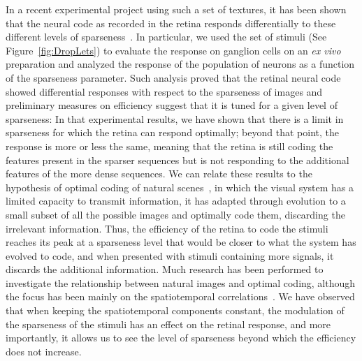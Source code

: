 \documentclass[a4paper, 10pt, twocolumns]{article}
\begin{document}
In a recent experimental project using such a set of textures, it has been shown that the neural code as recorded in the retina responds differentially to these different levels of sparseness~\citep{Ravello2015}. In particular, we used the set of stimuli (See Figure~\ref{fig:DropLets}) to evaluate the response on ganglion cells on an \emph{ex vivo} preparation and analyzed the response of the population of neurons as a function of the sparseness parameter. Such analysis proved that the retinal neural code showed differential responses with respect to the sparseness of images and preliminary measures on efficiency suggest that it is tuned for a given level of sparseness: In that experimental results, we have shown that there is a limit in sparseness for which the retina can respond optimally; beyond that point, the response is more or less the same, meaning that the retina is still coding the features present in the sparser sequences but is not responding to the additional features of the more dense sequences. We can relate these results to the hypothesis of optimal coding of natural scenes~\citep{Geisler:2008gu}, in which the visual system has a limited capacity to transmit information, it has adapted through evolution to a small subset of all the possible images and optimally code them, discarding the irrelevant information. Thus, the efficiency of the retina to code the stimuli reaches its peak at a sparseness level that would be closer to what the system has evolved to code, and when presented with stimuli containing more signals, it discards the additional information. Much research has been performed to investigate the relationship between natural images and optimal coding, although the focus has been mainly on the spatiotemporal correlations~\citep{Pitkow:2012dh,Rikhye:2015bg}. We have observed that when keeping the spatiotemporal components constant, the modulation of the sparseness of the stimuli has an effect on the retinal response, and more importantly, it allows us to see the level of sparseness beyond which the efficiency does not increase.
\end{document}

